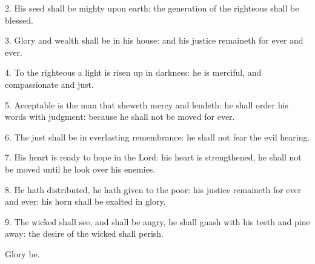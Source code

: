 
2. His seed shall be mighty upon earth: the generation of the righteous shall be blessed.

3. Glory and wealth shall be in his house: and his justice remaineth for ever and ever.

4. To the righteous a light is risen up in darkness: he is merciful, and compassionate and just.

5. Acceptable is the man that sheweth mercy and lendeth: he shall order his words with judgment:
because he shall not be moved for ever.

6. The just shall be in everlasting remembrance: he shall not fear the evil hearing.

7. His heart is ready to hope in the Lord: his heart is strengthened, he shall not be moved until he look over his enemies.

8. He hath distributed, he hath given to the poor: his justice remaineth for ever and ever: his horn shall be exalted in glory.

9. The wicked shall see, and shall be angry, he shall gnash with his teeth and pine away: the desire of the wicked shall perish. 

Glory be.